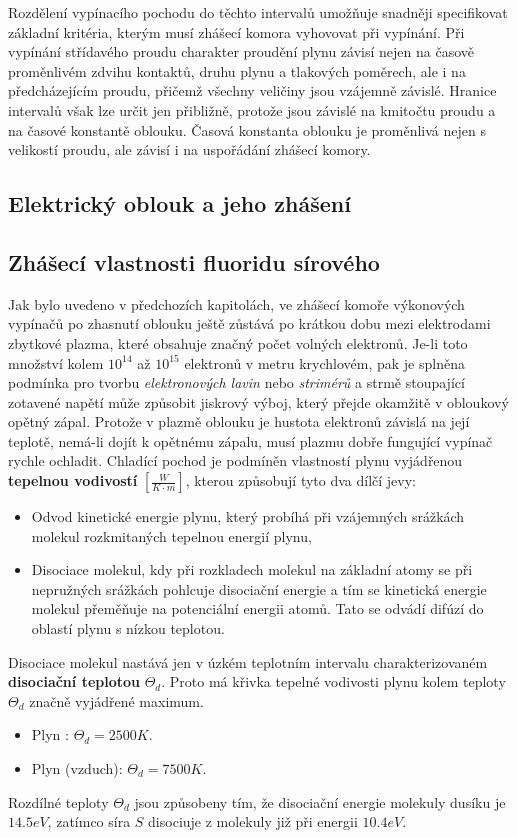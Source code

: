       Rozdělení vypínacího pochodu do těchto intervalů umožňuje snadněji specifikovat základní
      kritéria, kterým musí zhášecí komora vyhovovat při vypínání. Při vypínání střídavého proudu
      charakter proudění plynu závisí nejen na časově proměnlivém zdvihu kontaktů, druhu plynu a
      tlakových poměrech, ale i na předcházejícím proudu, přičemž všechny veličiny jsou vzájemně
      závislé. Hranice intervalů však lze určit jen přibližně, protože jsou závislé na kmitočtu
      proudu a na časové konstantě oblouku. Časová konstanta oblouku je proměn\-livá nejen s
      velikostí proudu, ale závisí i na uspořádání zhášecí komory.

  \subsection{Elektrický oblouk a jeho zhášení}
  \subsection{Zhášecí vlastnosti fluoridu sírového}
    Jak bylo uvedeno v předchozích kapitolách, ve zhášecí komoře vý\-ko\-no\-vých vypínačů po
    zhasnutí oblouku ještě zůstává po krátkou dobu mezi elektrodami zbytkové plazma, které obsahuje
    značný počet volných elektronů. Je-li toto množství kolem $10^{14}$ až $10^{15}$ elektronů v
    metru krychlovém, pak je splněna podmínka pro tvorbu \emph{elektronových lavin} nebo
    \emph{strimérů} a strmě stoupající zotavené napětí může způsobit jiskrový výboj, který přejde
    okamžitě v obloukový opětný zápal. Protože v plazmě oblouku je hustota elektronů závislá na její
    teplotě, nemá-li dojít k opětnému zápalu, musí plazmu dobře fungující vypínač rychle ochladit.
    Chladící  pochod je podmíněn vlastností plynu vyjádřenou \textbf{tepelnou vodivostí}
    $[\frac{W}{K\cdot m}]$,  kterou způsobují tyto dva dílčí jevy:
    \begin{itemize}
      \item Odvod kinetické energie plynu, který probíhá při vzájemných srážkách molekul 
            rozkmitaných tepelnou energií plynu,
      \item Disociace molekul, kdy při rozkladech molekul na základní atomy se při ne\-pru\-žných
            srážkách pohlcuje disociační energie a tím se kinetická energie molekul pře\-mě\-ňu\-je
            na potenciální energii atomů. Tato se odvádí difúzí do oblastí plynu s nízkou teplotou.
    \end{itemize}
    Disociace molekul nastává jen v úzkém teplotním intervalu charakterizovaném \textbf{disociační 
    teplotou} $\Theta_d$. Proto má křivka tepelné vodivosti plynu kolem teploty $\Theta_d$ značně 
    vyjádřené maximum.
    \begin{itemize}
      \item Plyn : \(\Theta_d = 2500 K\).
      \item Plyn  (vzduch): \(\Theta_d = 7500 K\).
    \end{itemize}
    Rozdílné teploty $\Theta_d$ jsou způsobeny tím, že disociační energie molekuly dusíku 
    je $14.5 eV$, zatímco síra $S$ disociuje z molekuly  již při energii $10.4 eV$.
   
